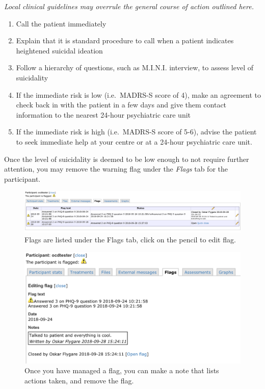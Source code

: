 \documentclass[]{book}
\providecommand{\tightlist}{%
  \setlength{\itemsep}{0pt}\setlength{\parskip}{0pt}}
\theoremstyle{definition}
\theoremstyle{definition}
\theoremstyle{definition}
\theoremstyle{remark}
\begin{document}
\emph{Local clinical guidelines may overrule the general course of
action outlined here.}

\begin{enumerate}
\def\labelenumi{\arabic{enumi}.}
\tightlist
\item
  Call the patient immediately
\item
  Explain that it is standard procedure to call when a patient indicates
  heightened suicidal ideation
\item
  Follow a hierarchy of questions, such as M.I.N.I. interview, to assess
  level of suicidality
\item
  If the immediate risk is low (i.e.~MADRS-S score of 4), make an
  agreement to check back in with the patient in a few days and give
  them contact information to the nearest 24-hour psychiatric care unit
\item
  If the immediate risk is high (i.e.~MADRS-S score of 5-6), advise the
  patient to seek immediate help at your centre or at a 24-hour
  psychiatric care unit.
\end{enumerate}

Once the level of suicidality is deemed to be low enough to not require
further attention, you may remove the warning flag under the
\emph{Flags} tab for the participant.

\begin{figure}
\centering
\includegraphics{images/flags-tab.png}
\caption{Flags are listed under the Flags tab, click on the pencil to
edit flag.}
\end{figure}

\begin{figure}
\centering
\includegraphics{images/remove-flag.png}
\caption{Once you have managed a flag, you can make a note that lists
actions taken, and remove the flag.}
\end{figure}
\end{document}
